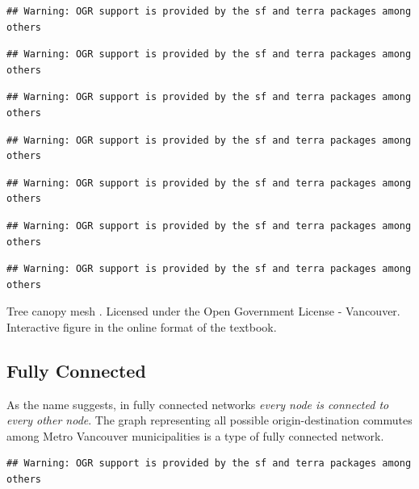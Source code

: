 \documentclass[
]{book}
\begin{document}
\begin{verbatim}
## Warning: OGR support is provided by the sf and terra packages among others
\end{verbatim}

\begin{verbatim}
## Warning: OGR support is provided by the sf and terra packages among others
\end{verbatim}

\begin{verbatim}
## Warning: OGR support is provided by the sf and terra packages among others
\end{verbatim}

\begin{verbatim}
## Warning: OGR support is provided by the sf and terra packages among others
\end{verbatim}

\begin{verbatim}
## Warning: OGR support is provided by the sf and terra packages among others
\end{verbatim}

\begin{verbatim}
## Warning: OGR support is provided by the sf and terra packages among others
\end{verbatim}

\begin{verbatim}
## Warning: OGR support is provided by the sf and terra packages among others
\end{verbatim}

\label{fig:8-tree-canopy-mesh}Tree canopy mesh \citep{city_of_vancouver_open_nodate}. Licensed under the Open Government License - Vancouver. Interactive figure in the online format of the textbook.

\hypertarget{fully-connected}{%
\subsection{Fully Connected}\label{fully-connected}}

As the name suggests, in fully connected networks \emph{every node is connected to every other node}. The graph representing all possible origin-destination commutes among Metro Vancouver municipalities is a type of fully connected network.

\begin{verbatim}
## Warning: OGR support is provided by the sf and terra packages among others
\end{verbatim}
\end{document}
